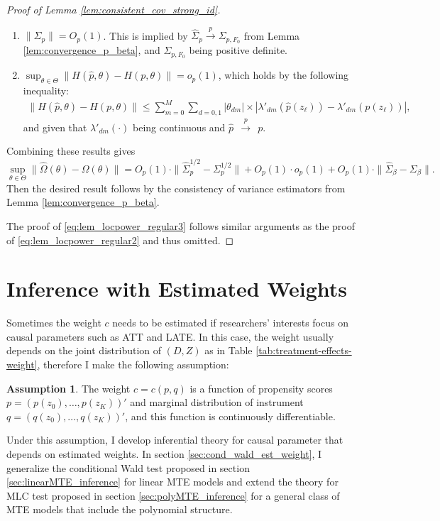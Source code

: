 \documentclass[11pt]{article}
\theoremstyle{definition}
\newtheorem{assumption}{Assumption}
\newcommand{\0}{\ensuremath{\mathbf{0}}}
\begin{document}
\begin{bibunit}
\begin{proof}[Proof of Lemma \ref{lem:consistent_cov_strong_id}]
\begin{enumerate}
    \item $\|\hat{\Sigma}_p\| = O_p(1)$. This is implied by $\hat{\Sigma}_p \xrightarrow{p} \Sigma_{p,F_0}$ from Lemma \ref{lem:convergence_p_beta}, and $\Sigma_{p,F_0}$ being positive definite.
    
    \item $\sup_{\theta \in \Theta}\|H(\hat{p},\theta) - H(p,\theta)\| = o_p(1)$, which holds by the following inequality:
    \begin{align*}
        \|H(\hat{p},\theta) - H(p,\theta)\| \leq \sum_{m=0}^M \sum_{d=0,1}|\theta_{dm}|\times|\lambda'_{dm}(\hat{p}(z_\ell)) - \lambda'_{dm}(p(z_\ell))|,
    \end{align*}
    and given that $\lambda'_{dm}(\cdot)$ being continuous and $\hat{p}~~ \xrightarrow{p}~~p$. 
\end{enumerate}

Combining these results gives
\[
    \sup_{\theta\in\Theta}\|\hat{\Omega}(\theta) - \Omega(\theta)\| = O_p(1) \cdot \|\hat{\Sigma}_p^{1/2} - {\Sigma}_{p}^{1/2}\| + O_p(1) \cdot o_p(1) + O_p(1)\cdot \|\hat{\Sigma}_\beta - \Sigma_{\beta}\|.
\]
Then the desired result follows by the consistency of variance estimators from Lemma \ref{lem:convergence_p_beta}.

The proof of \eqref{eq:lem_locpower_regular3} follows similar arguments as the proof of \eqref{eq:lem_locpower_regular2} and thus omitted.
\end{proof}

\newpage

%
\section{Inference with Estimated Weights}
\label{appendix:estimated_weights}

Sometimes the weight $c$ needs to be estimated if researchers' interests focus on causal parameters such as ATT and LATE. In this case, the weight usually depends on the joint distribution of $(D,Z)$ as in Table \ref{tab:treatment-effects-weight}, therefore I make the following assumption:
\begin{assumption}
\label{asp:estimated_weight}
The weight $c = c(p, q)$ is a function of propensity scores $p = (p(z_0),\ldots,p(z_K))'$ and marginal distribution of instrument $q=(q(z_0), \ldots, q(z_K))'$, and this function is continuously differentiable.
\end{assumption}

Under this assumption, I develop inferential theory for causal parameter that depends on estimated weights. In section \ref{sec:cond_wald_est_weight}, I generalize the conditional Wald test proposed in section \ref{sec:linearMTE_inference} for linear MTE models and extend the theory for MLC test proposed in section \ref{sec:polyMTE_inference} for a general class of MTE models that include the polynomial structure.


\end{bibunit}
\end{document}
